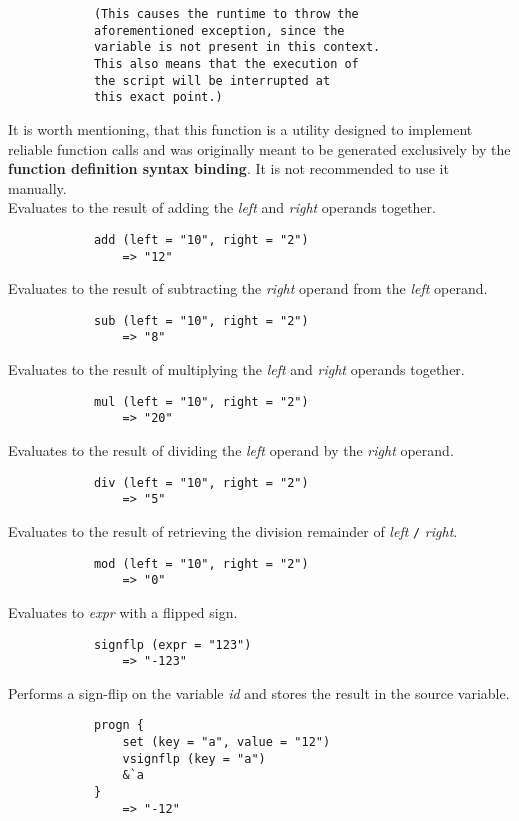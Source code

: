 \begin{multicols}{2}
\begin{verbatim}
			(This causes the runtime to throw the
			aforementioned exception, since the
			variable is not present in this context.
			This also means that the execution of
			the script will be interrupted at
			this exact point.)
    \end{verbatim}
    It is worth mentioning, that this function is a utility designed to implement reliable function calls and was originally meant
    to be generated exclusively by the \textbf{function definition syntax binding}. It is not recommended to use it manually.\\[3mm]
    Evaluates to the result of adding the \textit{left} and \textit{right} operands together.
    \begin{verbatim}
			add (left = "10", right = "2")
			    => "12"
    \end{verbatim}
    Evaluates to the result of subtracting the \textit{right} operand from the \textit{left} operand.
    \begin{verbatim}
			sub (left = "10", right = "2")
			    => "8"
    \end{verbatim}
    Evaluates to the result of multiplying the \textit{left} and \textit{right} operands together.
    \begin{verbatim}
			mul (left = "10", right = "2")
			    => "20"
    \end{verbatim}
    Evaluates to the result of dividing the \textit{left} operand by the \textit{right} operand.
    \begin{verbatim}
			div (left = "10", right = "2")
			    => "5"
    \end{verbatim}
    Evaluates to the result of retrieving the division remainder of \textit{left} \verb|/| \textit{right}.
    \begin{verbatim}
			mod (left = "10", right = "2")
			    => "0"
    \end{verbatim}
    Evaluates to \textit{expr} with a flipped sign.
    \begin{verbatim}
			signflp (expr = "123")
			    => "-123"
    \end{verbatim}
    Performs a sign-flip on the variable \textit{id} and stores the result in the source variable.
    \begin{verbatim}
			progn {
			    set (key = "a", value = "12")
			    vsignflp (key = "a")
			    &`a
			}
			    => "-12"

\end{verbatim}
\end{multicols}
